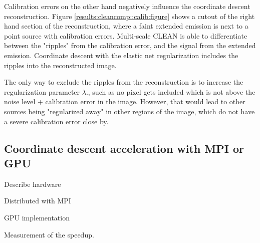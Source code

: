 Calibration errors on the other hand negatively influence the coordinate descent reconstruction. Figure \ref{results:cleancomp::calib:figure} shows a cutout of the right hand section of the reconstruction, where a faint extended emission is next to a point source with calibration errors. Multi-scale CLEAN is able to differentiate between the "ripples" from the calibration error, and the signal from the extended emission. Coordinate descent with the elastic net regularization includes the ripples into the reconstructed image. 

The only way to exclude the ripples from the reconstruction is to increase the regularization parameter $\lambda$., such as no pixel gets included which is not above the noise level + calibration error in the image. However, that would lead to other sources being "regularized away" in other regions of the image, which do not have a severe calibration error close by. 


\subsection{Coordinate descent acceleration with MPI or GPU}\label{results:speedup}
Describe hardware

Distributed with MPI

GPU implementation

Measurement of the speedup.

